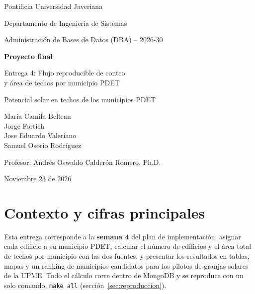\documentclass[11pt,a4paper]{article}
\newcommand{\campo}[1]{\texttt{#1}}
\begin{document}
\begin{titlepage}
  \centering
  {\large Pontificia Universidad Javeriana\par}
  {\large Departamento de Ingeniería de Sistemas\par}
  \vspace{0.8cm}
  {\large Administración de Bases de Datos (DBA) -- 2026-30\par}
  \vspace{2.5cm}
  {\Huge\bfseries Proyecto final\par}
  \vspace{1cm}
  {\LARGE Entrega 4: Flujo reproducible de conteo\\ y área de techos por municipio PDET\par}
  \vspace{1cm}
  {\large Potencial solar en techos de los municipios PDET\par}
  \vspace{3cm}
  {\large
    Maria Camila Beltran \\
    \vspace{0.5cm}
    Jorge Fortich \\
    \vspace{0.5cm}
    Jose Eduardo Valeriano \\
    \vspace{0.5cm}
    Samuel Osorio Rodríguez\par}
  \vspace{3cm}
  {\large Profesor: Andrés Oswaldo Calderón Romero, Ph.D.\par}
  \vspace{3cm}
  {\large Noviembre 23 de 2026\par}
\end{titlepage}

\tableofcontents
\newpage

\section{Contexto y cifras principales}
\label{sec:contexto}

Esta entrega corresponde a la \textbf{semana 4} del plan de implementación:
asignar cada edificio a su municipio PDET, calcular el número de edificios y el
área total de techos por municipio con las dos fuentes, y presentar los
resultados en tablas, mapas y un ranking de municipios candidatos para los
pilotos de granjas solares de la UPME. Todo el cálculo corre dentro de MongoDB
y se reproduce con un solo comando, \campo{make all}
(sección~\ref{sec:reproduccion}).
\end{document}
